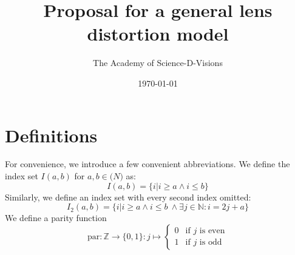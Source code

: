 \documentclass[10pt,a4paper]{article}
\title{Proposal for a general lens distortion model}
\author{The Academy of Science-D-Visions}
\date{\today}
\newcommand{\parity}{\mathrm{par}}
\newcommand{\beq}{\begin{equation}}
\newcommand{\eeq}{\end{equation}}
\begin{document}
\maketitle

\section{Definitions}
For convenience, we introduce a few convenient abbreviations.
We define the index set $I(a,b)$ for $a,b\in \mathbb(N)$ as:
\beq
I(a,b) = \{i | i \ge a \wedge i \le b\}
\eeq
Similarly, we define an index set with every second index omitted:
\beq
I_2(a,b) = \{i | i \ge a \wedge i \le b\ \wedge \exists j\in\mathbb{N} :  i = 2 j + a\}
\eeq
We define a parity function
\beq
\parity	: \mathbb{Z} \rightarrow \{0,1\} : j \mapsto
		\left\{
			\begin{array}{ll}
			0 & \text{if $j$ is even}\\
			1 & \text{if $j$ is odd}
			\end{array}
		\right.
\eeq
\end{document}
